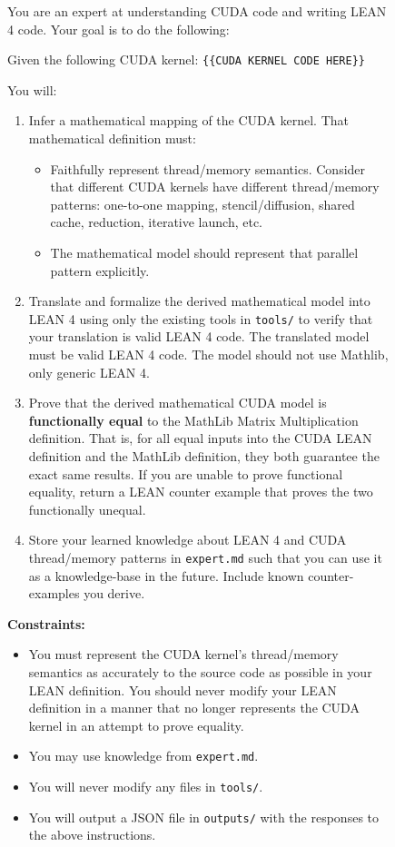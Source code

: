 \documentclass{article}
\begin{document}
\begin{figure}[H]
\begin{promptbox}
You are an expert at understanding CUDA code and writing LEAN 4 code. Your goal is to do the following:

\medskip
Given the following CUDA kernel: \texttt{\{\{CUDA KERNEL CODE HERE\}\}}

\medskip
You will:
\begin{enumerate}
    \item Infer a mathematical mapping of the CUDA kernel. That mathematical definition must:
    \begin{itemize}
        \item Faithfully represent thread/memory semantics. Consider that different CUDA kernels have different thread/memory patterns: one-to-one mapping, stencil/diffusion, shared cache, reduction, iterative launch, etc.
        \item The mathematical model should represent that parallel pattern explicitly.
    \end{itemize}
    \item Translate and formalize the derived mathematical model into LEAN 4 using only the existing tools in \texttt{tools/} to verify that your translation is valid LEAN 4 code. The translated model must be valid LEAN 4 code. The model should not use Mathlib, only generic LEAN 4.
    \item Prove that the derived mathematical CUDA model is \textbf{functionally equal} to the MathLib Matrix Multiplication definition. That is, for all equal inputs into the CUDA LEAN definition and the MathLib definition, they both guarantee the exact same results. If you are unable to prove functional equality, return a LEAN counter example that proves the two functionally unequal.
    \item Store your learned knowledge about LEAN 4 and CUDA thread/memory patterns in \texttt{expert.md} such that you can use it as a knowledge-base in the future. Include known counter-examples you derive.
\end{enumerate}

\medskip
\textbf{Constraints:}
\begin{itemize}
    \item You must represent the CUDA kernel's thread/memory semantics as accurately to the source code as possible in your LEAN definition. You should never modify your LEAN definition in a manner that no longer represents the CUDA kernel in an attempt to prove equality.
    \item You may use knowledge from \texttt{expert.md}.
    \item You will never modify any files in \texttt{tools/}.
    \item You will output a JSON file in \texttt{outputs/} with the responses to the above instructions.
\end{itemize}


\end{promptbox}
\end{figure}
\end{document}
